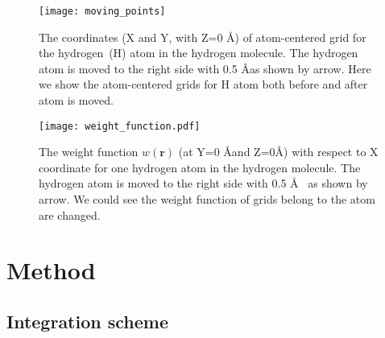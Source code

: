 \documentclass[journal=jpca,manuscript=article]{achemso}
\begin{document}
\begin{figure}
 \texttt{[image: moving\_points]}
 \caption{The coordinates (X and Y, with Z=0 \AA) of atom-centered grid for the hydrogen~(H) atom in the hydrogen molecule. The hydrogen atom is moved to the right side with 0.5 \AA as shown by arrow. Here
we show the atom-centered grids for H atom both before and after atom is moved.}
 \label{fig:moving_points}
\end{figure}

\begin{figure}
 \texttt{[image: weight\_function.pdf]}
 \caption{The weight function $w(\mathbf{r})$ (at Y=0 \AA and Z=0\AA) with respect to X coordinate for one hydrogen atom in the hydrogen molecule. The hydrogen atom is moved to the right side with 0.5 \AA ~ as shown by arrow. We could see the weight function of grids belong to the atom are changed.}
 \label{fig:weight_function}
\end{figure}




\section{Method}
\label{sec:theory}

\subsection{Integration scheme}
\label{subsec:integration}
\end{document}
